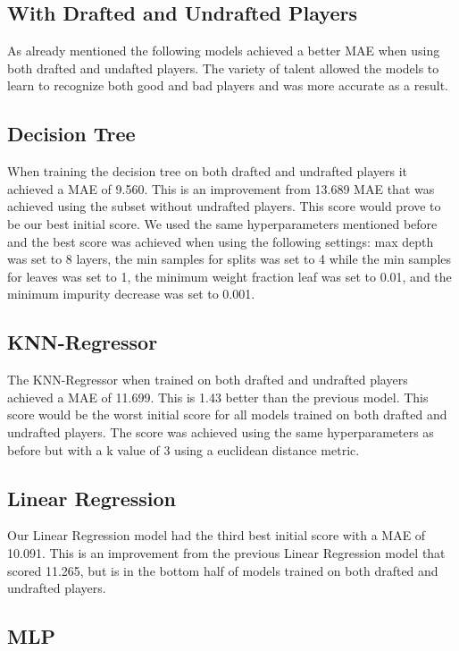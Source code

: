 \documentclass{article}
\begin{document}
\subsection{With Drafted and Undrafted Players}

As already mentioned the following models achieved a better MAE when using both drafted and undafted players. 
The variety of talent allowed the models to learn to recognize both good and bad players and was more accurate as a result.

\subsection{Decision Tree}

When training the decision tree on both drafted and undrafted players it achieved a MAE of 9.560. 
This is an improvement from 13.689 MAE that was achieved using the subset without undrafted players.
This score would prove to be our best initial score. We used the same hyperparameters mentioned before and the
best score was achieved when using the following settings: max depth was set to 8 layers, 
the min samples for splits was set to 4 while the min samples for leaves was set to 1, the minimum weight fraction leaf 
was set to 0.01, and the minimum impurity decrease was set to 0.001.

\subsection{KNN-Regressor}

The KNN-Regressor when trained on both drafted and undrafted players achieved a MAE of 11.699. This is 1.43 better than 
the previous model. This score would be the worst initial score for all models trained on both drafted and undrafted players.
The score was achieved using the same hyperparameters as before but with a k value of 3 using a euclidean distance metric.

\subsection{Linear Regression}

Our Linear Regression model had the third best initial score with a MAE of 10.091. This is an improvement from the previous 
Linear Regression model that scored 11.265, but is in the bottom half of models trained on both drafted and undrafted players.

\subsection{MLP}
\end{document}
